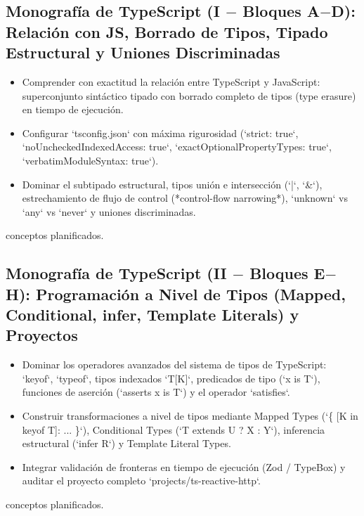 \documentclass{book}
\begin{document}
\subsection*{\checkmark Monografía de TypeScript (I \(-\) Bloques A\(-\)D): Relación con JS, Borrado de Tipos, Tipado Estructural y Uniones Discriminadas}
\begin{itemize}
\item Comprender con exactitud la relación entre TypeScript y JavaScript: superconjunto sintáctico tipado con borrado completo de tipos (type erasure) en tiempo de ejecución.
\item Configurar `tsconfig.json` con máxima rigurosidad (`strict: true`, `noUncheckedIndexedAccess: true`, `exactOptionalPropertyTypes: true`, `verbatimModuleSyntax: true`).
\item Dominar el subtipado estructural, tipos unión e intersección (`|`, `\&`), estrechamiento de flujo de control (*control-flow narrowing*), `unknown` vs `any` vs `never` y uniones discriminadas.
\end{itemize}
 conceptos planificados.

\subsection*{\checkmark Monografía de TypeScript (II \(-\) Bloques E\(-\)H): Programación a Nivel de Tipos (Mapped, Conditional, infer, Template Literals) y Proyectos}
\begin{itemize}
\item Dominar los operadores avanzados del sistema de tipos de TypeScript: `keyof`, `typeof`, tipos indexados `T[K]`, predicados de tipo (`x is T`), funciones de aserción (`asserts x is T`) y el operador `satisfies`.
\item Construir transformaciones a nivel de tipos mediante Mapped Types (`\{ [K in keyof T]: ... \}`), Conditional Types (`T extends U ? X : Y`), inferencia estructural (`infer R`) y Template Literal Types.
\item Integrar validación de fronteras en tiempo de ejecución (Zod / TypeBox) y auditar el proyecto completo `projects/ts-reactive-http`.
\end{itemize}
 conceptos planificados.
\end{document}
